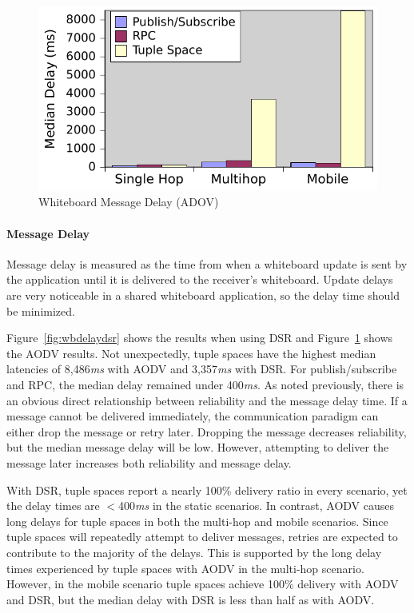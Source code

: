 \begin{figure}
\centering
\label{fig:wbdelayaodv}
\includegraphics[scale = 1, clip, trim = 6px 0px 2px 3px]{figures/wb-aodv-delay.pdf}
\caption{Whiteboard Message Delay (ADOV)}
\end{figure}

\paragraph{Message Delay}

Message delay is measured as the time from when a whiteboard update is sent by the application until it is delivered to the receiver's whiteboard. Update delays are very noticeable in a shared whiteboard application, so the delay time should be minimized.

Figure~\ref{fig:wbdelaydsr} shows the results when using DSR and Figure~\ref{fig:wbdelayaodv} shows the AODV results. Not unexpectedly, tuple spaces have the highest median latencies of 8,486\textit{ms} with AODV and 3,357\textit{ms} with DSR. For publish/subscribe and RPC, the median delay remained under 400\textit{ms}. As noted previously, there is an obvious direct relationship between reliability and the message delay time. If a message cannot be delivered immediately, the communication paradigm can either drop the message or retry later. Dropping the message decreases reliability, but the median message delay will be low. However, attempting to deliver the message later increases both reliability and message delay.

With DSR, tuple spaces report a nearly 100\% delivery ratio in every scenario, yet the delay times are $<$400\textit{ms} in the static scenarios. In contrast, AODV causes long delays for tuple spaces in both the multi-hop and mobile scenarios. Since tuple spaces will repeatedly attempt to deliver messages, retries are expected to contribute to the majority of the delays. This is supported by the long delay times experienced by tuple spaces with AODV in the multi-hop scenario. However, in the mobile scenario tuple spaces achieve 100\% delivery with AODV and DSR, but the median delay with DSR is less than half as with AODV.

